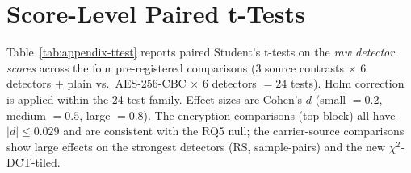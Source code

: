\documentclass[10pt,twocolumn,a4paper]{article}
\begin{document}
\section{Score-Level Paired t-Tests}
\label{app:t-tests}
Table~\ref{tab:appendix-ttest} reports paired Student's t-tests on the \emph{raw detector scores} across the four pre-registered comparisons (3 source contrasts $\times$ 6 detectors $+$ plain vs.\ AES-256-CBC $\times$ 6 detectors $=24$ tests). Holm correction is applied within the 24-test family. Effect sizes are Cohen's $d$ (small $\!=\!0.2$, medium $\!=\!0.5$, large $\!=\!0.8$). The encryption comparisons (top block) all have $|d|\!\leq\!0.029$ and are consistent with the RQ5 null; the carrier-source comparisons show large effects on the strongest detectors (RS, sample-pairs) and the new $\chi^2$-DCT-tiled.
\end{document}
